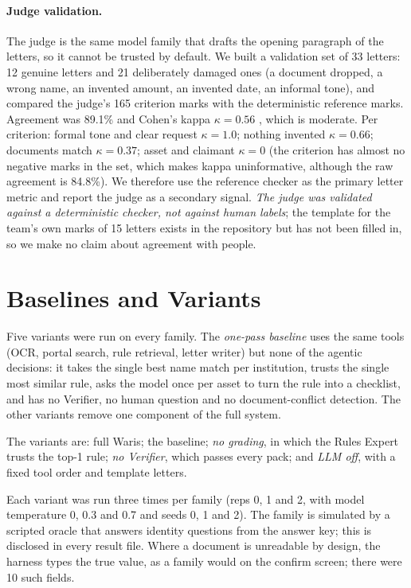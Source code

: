 \documentclass[12pt,a4paper,oneside]{report}
\begin{document}
\paragraph{Judge validation.} The judge is the same model family that drafts the opening paragraph of the letters, so it cannot be trusted by default. We built a validation set of 33 letters: 12 genuine letters and 21 deliberately damaged ones (a document dropped, a wrong name, an invented amount, an invented date, an informal tone), and compared the judge's 165 criterion marks with the deterministic reference marks. Agreement was 89.1\% and Cohen's kappa $\kappa=0.56$ \cite{cohen1960kappa}, which is moderate. Per criterion: formal tone and clear request $\kappa=1.0$; nothing invented $\kappa=0.66$; documents match $\kappa=0.37$; asset and claimant $\kappa=0$ (the criterion has almost no negative marks in the set, which makes kappa uninformative, although the raw agreement is 84.8\%). We therefore use the reference checker as the primary letter metric and report the judge as a secondary signal. \emph{The judge was validated against a deterministic checker, not against human labels}; the template for the team's own marks of 15 letters exists in the repository but has not been filled in, so we make no claim about agreement with people.

\section{Baselines and Variants}
Five variants were run on every family. The \emph{one-pass baseline} uses the same tools (OCR, portal search, rule retrieval, letter writer) but none of the agentic decisions: it takes the single best name match per institution, trusts the single most similar rule, asks the model once per asset to turn the rule into a checklist, and has no Verifier, no human question and no document-conflict detection. The other variants remove one component of the full system.

The variants are: full Waris; the baseline; \emph{no grading}, in which the Rules Expert trusts the top-1 rule; \emph{no Verifier}, which passes every pack; and \emph{LLM off}, with a fixed tool order and template letters.

Each variant was run three times per family (reps 0, 1 and 2, with model temperature 0, 0.3 and 0.7 and seeds 0, 1 and 2). The family is simulated by a scripted oracle that answers identity questions from the answer key; this is disclosed in every result file. Where a document is unreadable by design, the harness types the true value, as a family would on the confirm screen; there were 10 such fields.
\end{document}
